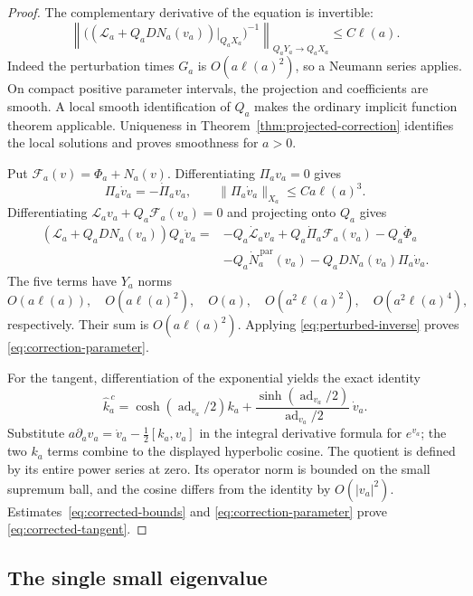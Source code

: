 \begin{proof}
The complementary derivative of the equation is invertible:
\begin{equation}\label{eq:perturbed-inverse}
 \left\|\bigl((\mathcal L_a+Q_aDN_a(v_a))|_{Q_aX_a}\bigr)^{-1}
       \right\|_{Q_aY_a\to Q_aX_a}\le C\ell(a).
\end{equation}
Indeed the perturbation times \(G_a\) is \(O(a\ell(a)^2)\),
so a Neumann series applies. On compact positive parameter
intervals, the projection and coefficients are smooth.
A local smooth identification of \(Q_a\) makes the
ordinary implicit function theorem applicable. Uniqueness
in Theorem~\ref{thm:projected-correction} identifies the local
solutions and proves smoothness for \(a>0\).

Put \(\mathcal F_a(v)=\Phi_a+N_a(v)\).
Differentiating \(\Pi_av_a=0\) gives
\[
 \Pi_a\dot v_a=-\dot\Pi_av_a,
 \qquad \|\Pi_a\dot v_a\|_{X_a}\le Ca\ell(a)^3.
\]
Differentiating
\(\mathcal L_av_a+Q_a\mathcal F_a(v_a)=0\) and projecting
onto \(Q_a\) gives
\begin{align*}
 (\mathcal L_a+Q_aDN_a(v_a))Q_a\dot v_a
 ={}&-Q_a\dot{\mathcal L}_av_a
      +Q_a\dot\Pi_a\mathcal F_a(v_a)-Q_a\dot\Phi_a\\
    &-Q_a\dot N_a^{\,\mathrm{par}}(v_a)
      -Q_aDN_a(v_a)\Pi_a\dot v_a.
\end{align*}
The five terms have \(Y_a\) norms
\[
 O(a\ell(a)),\quad O(a\ell(a)^2),\quad O(a),\quad
 O(a^2\ell(a)^2),\quad O(a^2\ell(a)^4),
\]
respectively. Their sum is \(O(a\ell(a)^2)\).
Applying \eqref{eq:perturbed-inverse} proves
\eqref{eq:correction-parameter}.

For the tangent, differentiation of the exponential yields
the exact identity
\begin{equation}\label{eq:centered-tangent-formula}
 \widehat k_a^{\,c}
 =\cosh(\operatorname{ad}_{v_a}/2)k_a+
   \frac{\sinh(\operatorname{ad}_{v_a}/2)}
        {\operatorname{ad}_{v_a}/2}\,\dot v_a.
\end{equation}
Substitute
\(a\partial_av_a=\dot v_a-\frac12[k_a,v_a]\)
in the integral derivative formula for \(e^{v_a}\);
the two \(k_a\) terms combine to the displayed hyperbolic
cosine. The quotient is defined by its entire power
series at zero. Its operator norm is bounded on the
small supremum ball, and the cosine differs from the
identity by \(O(|v_a|^2)\).
Estimates~\eqref{eq:corrected-bounds} and
\eqref{eq:correction-parameter} prove
\eqref{eq:corrected-tangent}.
\end{proof}

\subsection{The single small eigenvalue}

